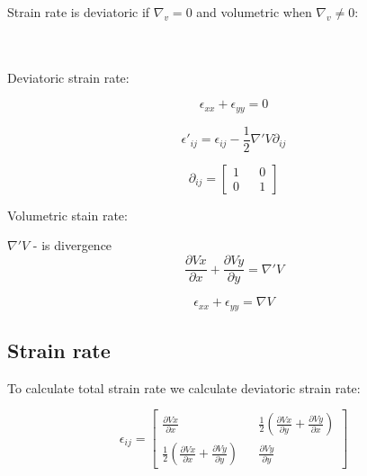 \documentclass{article}
\begin{document}
    Strain rate is deviatoric  if $\nabla_{v} = 0$ and volumetric when $\nabla_{v} \neq 0$:

    \\ \\

    Deviatoric strain rate:

    \begin{equation}
        \epsilon_{xx} + \epsilon_{yy} = 0
    \end{equation}

    \begin{equation}
        \epsilon ' _{ij} = \epsilon_{ij} - \frac{1}{2} \nabla ' V \partial_{ij}
    \end{equation}

    \begin{equation}
        \partial_{ij} = \begin{bmatrix}
                            1 && 0 \\ 0 && 1
        \end{bmatrix}
    \end{equation}

    Volumetric stain rate:

    $ \nabla ' V$ - is divergence
    \begin{equation}
        \frac{\partial Vx}{\partial x} + \frac{\partial Vy}{\partial y} = \nabla ' V
    \end{equation}

    \begin{equation}
        \epsilon_{xx} + \epsilon_{yy} = \nabla  V
    \end{equation}

    \subsection{Strain rate}

    To calculate total strain rate we calculate deviatoric strain rate:

    \begin{equation}
        \epsilon_{ij} =
        \begin{bmatrix}
            \frac{\partial Vx}{\partial x} && \frac{1}{2}(\frac{\partial Vx}{\partial y} + \frac{\partial Vy}{\partial x}) \\
            \frac{1}{2}(\frac{\partial Vx}{\partial x} + \frac{\partial Vy}{\partial y}) && \frac{\partial Vy}{\partial y}
        \end{bmatrix}
    \end{equation}
\end{document}
